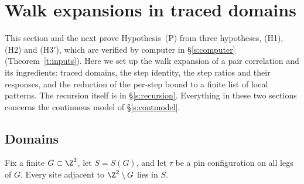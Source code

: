 \section{Walk expansions in traced domains}\label{s:walks}

This section and the next prove Hypothesis~(P) from three hypotheses, (H1), (H2) and (H3$'$), which are verified by computer in \S\ref{s:computer} (Theorem~\ref{t:inputs}). Here we set up the walk expansion of a pair correlation and its ingredients: traced domains, the step identity, the step ratios and their responses, and the reduction of the per-step bound to a finite list of local patterns. The recursion itself is in \S\ref{s:recursion}. Everything in these two sections concerns the continuous model of \S\ref{s:contmodel}.

\subsection{Domains}\label{s:domains}

Fix a finite $G \subset \Z^2$, let $S = S(G)$, and let $\tau$ be a pin configuration on all legs of $G$. Every site adjacent to $\Z^2 \setminus G$ lies in $S$.

